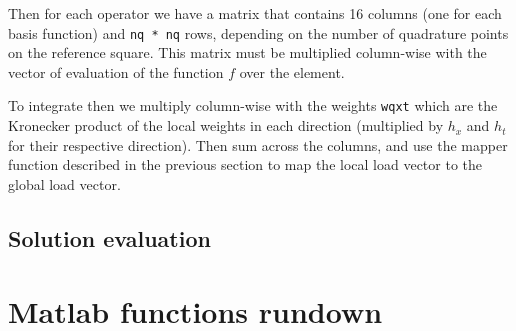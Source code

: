 \documentclass[]{report}
\begin{document}
    Then for each operator we have a matrix that contains 16 columns (one for each basis function) and \texttt{nq * nq} rows, depending on the number of quadrature points on the reference square. This matrix must be multiplied column-wise with the vector of evaluation of the function $f$ over the element.

    To integrate then we multiply column-wise with the weights \texttt{wqxt} which are the Kronecker product of the local weights in each direction (multiplied by $h_x$ and $h_t$ for their respective direction). 
    Then sum across the columns, and use the mapper function described in the previous section to map the local load vector to the global load vector.
    \section*{Solution evaluation}


    \chapter*{Matlab functions rundown}
\end{document}
